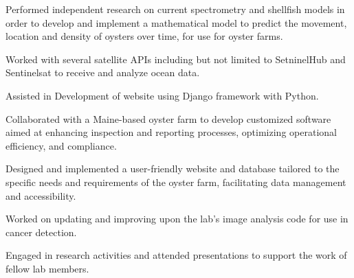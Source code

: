 \documentclass[letterpaper]{AMcEnaneyResume} %
\begin{document}
\begin{minipage}[t]{0.66\textwidth}
        \sectionspace %



        \begin{tightitemize}
            \item Performed independent research on current spectrometry and shellfish models in order to develop and implement a mathematical model to predict the movement, location and density of oysters over time, for use for oyster farms.
            \item Worked with several satellite APIs including but not limited to SetninelHub and Sentinelsat to receive and analyze ocean data.
            \item Assisted in Development of website using Django framework with Python.
        \end{tightitemize}

        \sectionspace %



        \begin{tightitemize}
            \item Collaborated with a Maine-based oyster farm to develop customized software aimed at enhancing inspection and reporting processes, optimizing operational efficiency, and compliance.
            \item Designed and implemented a user-friendly website and database tailored to the specific needs and requirements of the oyster farm, facilitating data management and accessibility.
        \end{tightitemize}

        \sectionspace %



        \begin{tightitemize}
            \item Worked on updating and improving upon the lab's image analysis code for use in cancer detection.
            \item Engaged in research activities and attended presentations to support the work of fellow lab members.
        \end{tightitemize}


\end{minipage}
\end{document}
